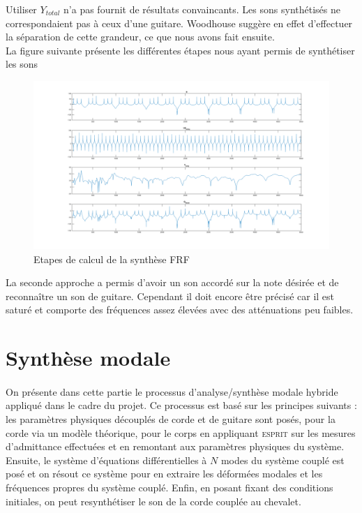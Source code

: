 Utiliser $Y_{total}$ n'a pas fournit de résultats convaincants. Les sons
synthétisés ne correspondaient pas à ceux d'une guitare. Woodhouse suggère en
effet d'effectuer la séparation de cette grandeur, ce que nous avons fait
ensuite.\\

La figure suivante présente les différentes étapes nous ayant permis de
synthétiser les sons

\begin{figure}[h]
\centering
\includegraphics[width=\linewidth]{figures/frf_rapport_intermediaire.png}
\caption{Etapes de calcul de la synthèse FRF}
\label{fig:FRF1}
\end{figure}

La seconde approche a permis d'avoir un son accordé sur la note désirée et de
reconnaître un son de guitare. Cependant il doit encore être précisé car il est
saturé et comporte des fréquences assez élevées avec des atténuations peu
faibles.


%
%
%
%


\section{Synthèse modale}

\paragraph{}
  On présente dans cette partie le processus d'analyse/synthèse modale hybride
appliqué dans le cadre du projet. Ce processus est basé sur les principes
suivants : les paramètres physiques découplés de corde et de guitare sont
posés, pour la corde via un modèle théorique, pour le corps en appliquant
\textsc{esprit} sur les mesures d'admittance effectuées et en remontant aux
paramètres physiques du système.
  Ensuite, le système d'équations différentielles à \( N \) modes du système
couplé est posé et on résout ce système pour en extraire les déformées modales
et les fréquences propres du système couplé. Enfin, en posant fixant des
conditions initiales, on peut resynthétiser le son de la corde couplée au
chevalet.

